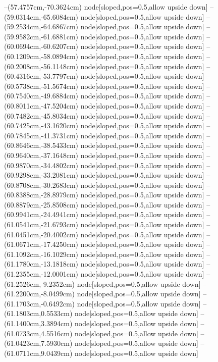 --(57.4757cm,-70.3624cm) node[sloped,pos=0.5,allow upside down]{\arrowIn}
--(59.0314cm,-65.6084cm) node[sloped,pos=0.5,allow upside down]{\ArrowIn}
--(59.2534cm,-64.6867cm) node[sloped,pos=0.5,allow upside down]{\arrowIn}
--(59.9582cm,-61.6881cm) node[sloped,pos=0.5,allow upside down]{\ArrowIn}
--(60.0694cm,-60.6207cm) node[sloped,pos=0.5,allow upside down]{\ArrowIn}
--(60.1209cm,-58.0894cm) node[sloped,pos=0.5,allow upside down]{\ArrowIn}
--(60.2008cm,-56.1148cm) node[sloped,pos=0.5,allow upside down]{\ArrowIn}
--(60.4316cm,-53.7797cm) node[sloped,pos=0.5,allow upside down]{\ArrowIn}
--(60.5738cm,-51.5674cm) node[sloped,pos=0.5,allow upside down]{\ArrowIn}
--(60.7540cm,-49.6884cm) node[sloped,pos=0.5,allow upside down]{\ArrowIn}
--(60.8011cm,-47.5204cm) node[sloped,pos=0.5,allow upside down]{\ArrowIn}
--(60.7482cm,-45.8034cm) node[sloped,pos=0.5,allow upside down]{\ArrowIn}
--(60.7425cm,-43.1620cm) node[sloped,pos=0.5,allow upside down]{\ArrowIn}
--(60.7845cm,-41.3731cm) node[sloped,pos=0.5,allow upside down]{\ArrowIn}
--(60.8646cm,-38.5433cm) node[sloped,pos=0.5,allow upside down]{\ArrowIn}
--(60.9640cm,-37.1648cm) node[sloped,pos=0.5,allow upside down]{\ArrowIn}
--(60.9870cm,-34.4802cm) node[sloped,pos=0.5,allow upside down]{\ArrowIn}
--(60.9298cm,-33.2081cm) node[sloped,pos=0.5,allow upside down]{\ArrowIn}
--(60.8708cm,-30.2683cm) node[sloped,pos=0.5,allow upside down]{\ArrowIn}
--(60.8388cm,-28.8979cm) node[sloped,pos=0.5,allow upside down]{\ArrowIn}
--(60.8879cm,-25.8508cm) node[sloped,pos=0.5,allow upside down]{\ArrowIn}
--(60.9941cm,-24.4941cm) node[sloped,pos=0.5,allow upside down]{\ArrowIn}
--(61.0541cm,-21.6793cm) node[sloped,pos=0.5,allow upside down]{\ArrowIn}
--(61.0451cm,-20.4002cm) node[sloped,pos=0.5,allow upside down]{\ArrowIn}
--(61.0671cm,-17.4250cm) node[sloped,pos=0.5,allow upside down]{\ArrowIn}
--(61.1092cm,-16.1029cm) node[sloped,pos=0.5,allow upside down]{\ArrowIn}
--(61.1780cm,-13.1818cm) node[sloped,pos=0.5,allow upside down]{\ArrowIn}
--(61.2355cm,-12.0001cm) node[sloped,pos=0.5,allow upside down]{\ArrowIn}
--(61.2526cm,-9.2352cm) node[sloped,pos=0.5,allow upside down]{\ArrowIn}
--(61.2200cm,-8.0499cm) node[sloped,pos=0.5,allow upside down]{\ArrowIn}
--(61.1703cm,-0.6492cm) node[sloped,pos=0.5,allow upside down]{\ArrowIn}
--(61.1803cm,0.5533cm) node[sloped,pos=0.5,allow upside down]{\ArrowIn}
--(61.1400cm,3.3894cm) node[sloped,pos=0.5,allow upside down]{\ArrowIn}
--(61.0733cm,4.5516cm) node[sloped,pos=0.5,allow upside down]{\ArrowIn}
--(61.0423cm,7.5930cm) node[sloped,pos=0.5,allow upside down]{\ArrowIn}
--(61.0711cm,9.0439cm) node[sloped,pos=0.5,allow upside down]{\ArrowIn}
